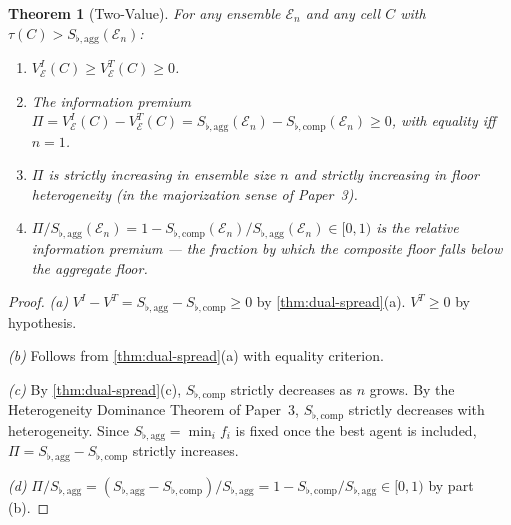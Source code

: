 \documentclass[twocolumn,11pt,a4paper]{article}
\newtheorem{theorem}{Theorem}[section]
\theoremstyle{remark}
\newcommand{\tol}{\tau}
\newcommand{\Ens}{\mathcal{E}}
\newcommand{\ValT}{V^T}                  %
\newcommand{\ValI}{V^I}                  %
\newcommand{\SflatT}{S_{\flat,\mathrm{agg}}}        %
\newcommand{\SflatI}{S_{\flat,\mathrm{comp}}}       %
\newcommand{\Prem}{\Pi}                  %
\begin{document}
\begin{theorem}[Two-Value]
\label{thm:two-value}
For any ensemble $\Ens_n$ and any cell $C$ with $\tol(C) > \SflatT(\Ens_n)$:
\begin{enumerate}[label=\textup{(\alph*)}]
\item $\ValI_\Ens(C) \ge \ValT_\Ens(C) \ge 0$.
\item The information premium $\Prem = \ValI_\Ens(C) - \ValT_\Ens(C) =
  \SflatT(\Ens_n) - \SflatI(\Ens_n) \ge 0$, with equality iff $n=1$.
\item $\Prem$ is strictly increasing in ensemble size $n$ and strictly
  increasing in floor heterogeneity (in the majorization sense of Paper~3).
\item $\Prem/\SflatT(\Ens_n) = 1 - \SflatI(\Ens_n)/\SflatT(\Ens_n) \in [0,1)$
  is the \emph{relative information premium} — the fraction by which the
  composite floor falls below the aggregate floor.
\end{enumerate}
\end{theorem}
\begin{proof}
\textit{(a)}  $\ValI - \ValT = \SflatT - \SflatI \ge 0$ by \cref{thm:dual-spread}(a).
$\ValT \ge 0$ by hypothesis.

\textit{(b)}  Follows from \cref{thm:dual-spread}(a) with equality criterion.

\textit{(c)}  By \cref{thm:dual-spread}(c), $\SflatI$ strictly decreases
as $n$ grows.  By the Heterogeneity Dominance Theorem of Paper~3, $\SflatI$
strictly decreases with heterogeneity.  Since $\SflatT = \min_i f_i$ is
fixed once the best agent is included, $\Prem = \SflatT - \SflatI$ strictly
increases.

\textit{(d)}  $\Prem/\SflatT = (\SflatT - \SflatI)/\SflatT = 1 - \SflatI/\SflatT \in [0,1)$
by part (b).
\end{proof}
\end{document}
